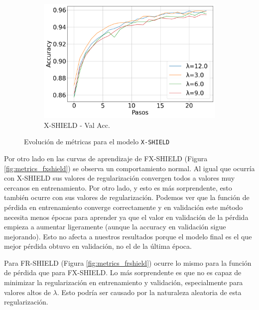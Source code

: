 \begin{figure}[H]
\begin{subfigure}[b]{0.3\textwidth}
        \includegraphics[width=\linewidth]{images/Val_Accuracy_evolucion_xshield.png}
        \caption{X-SHIELD - Val Acc.}
    \end{subfigure}

    \caption{Evolución de métricas para el modelo \texttt{X-SHIELD}}
    \label{fig:metrics_xshield}
\end{figure}

Por otro lado en las curvas de aprendizaje de FX-SHIELD (Figura \ref{fig:metrics_fxshield}) se observa un comportamiento normal. Al igual que ocurría con X-SHIELD sus valores de regularización convergen todos a valores muy cercanos en entrenamiento. Por otro lado, y esto es más sorprendente, esto también ocurre con sus valores de regularización. Podemos ver que la función de pérdida en entrenamiento converge correctamente y en validación este método necesita menos épocas para aprender ya que el valor en validación de la pérdida empieza a aumentar ligeramente (aunque la accuracy en validación sigue mejorando). Esto no afecta a nuestros resultados porque el modelo final es el que mejor pérdida obtuvo en validación, no el de la última época.

Para FR-SHIELD (Figura \ref{fig:metrics_frshield}) ocurre lo mismo para la función de pérdida que para FX-SHIELD. Lo más sorprendente es que no es capaz de minimizar la regularización en entrenamiento y validación, especialmente para valores altos de $\lambda$. Esto podría ser causado por la naturaleza aleatoria de esta regularización.


